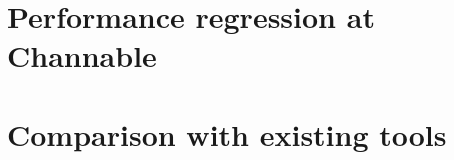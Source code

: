 \begin{listing}[H]
\begin{verbatim}
\end{verbatim}
\end{listing}



\section{Performance regression at Channable}

%

\section{Comparison with existing tools}
